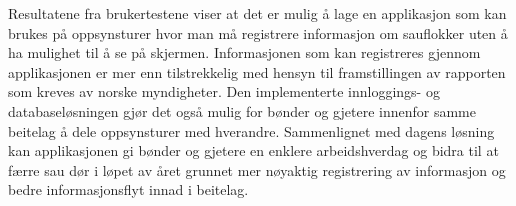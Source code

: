 \newline
\newline
Resultatene fra brukertestene viser at det er mulig å lage en applikasjon som kan brukes på oppsynsturer hvor man må registrere informasjon om sauflokker uten å ha mulighet til å se på skjermen. Informasjonen som kan registreres gjennom applikasjonen er mer enn tilstrekkelig med hensyn til framstillingen av rapporten som kreves av norske myndigheter. Den implementerte innloggings- og databaseløsningen gjør det også mulig for bønder og gjetere innenfor samme beitelag å dele oppsynsturer med hverandre. Sammenlignet med dagens løsning kan applikasjonen gi bønder og gjetere en enklere arbeidshverdag og bidra til at færre sau dør i løpet av året grunnet mer nøyaktig registrering av informasjon og bedre informasjonsflyt innad i beitelag.

